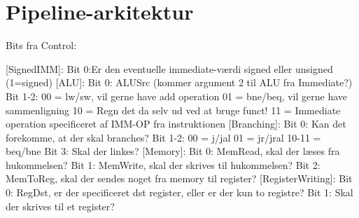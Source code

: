 \section{Pipeline-arkitektur}

Bits fra Control:

[SignedIMM]:
    Bit 0:Er den eventuelle immediate-værdi signed eller unsigned (1=signed)
[ALU]:
    Bit 0: ALUSrc (kommer argument 2 til ALU fra Immediate?)
    Bit 1-2: 00 = lw/sw, vil gerne have add operation
             01 = bne/beq, vil gerne have sammenligning
             10 = Regn det da selv ud ved at bruge funct!
             11 = Immediate operation specificeret af IMM-OP fra instruktionen
[Branching]:
    Bit 0: Kan det forekomme, at der skal branches?
    Bit 1-2: 00 = j/jal
             01 = jr/jral
             10-11 = beq/bne
    Bit 3: Skal der linkes?
[Memory]:
    Bit 0: MemRead, skal der læses fra hukommelsen?
    Bit 1: MemWrite, skal der skrives til hukommelsen?
    Bit 2: MemToReg, skal der sendes noget fra memory til register?
[RegisterWriting]:
    Bit 0: RegDst, er der specificeret dst register, eller er der kun to
           registre?
    Bit 1: Skal der skrives til et register?
